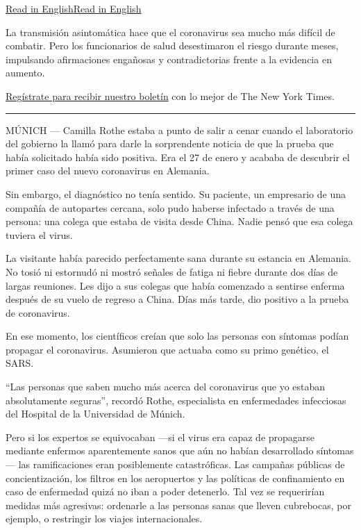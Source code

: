 \href{https://www.nytimes3xbfgragh.onion/2020/06/27/world/europe/coronavirus-spread-asymptomatic.html}{Read
in
English}\href{https://www.nytimes3xbfgragh.onion/2020/06/27/world/europe/coronavirus-spread-asymptomatic.html}{Read
in English}

La transmisión asintomática hace que el coronavirus sea mucho más
difícil de combatir. Pero los funcionarios de salud desestimaron el
riesgo durante meses, impulsando afirmaciones engañosas y
contradictorias frente a la evidencia en aumento.

\href{https://www.nytimes3xbfgragh.onion/newsletters/el-times}{Regístrate
para recibir nuestro boletín} con lo mejor de The New York Times.

\begin{center}\rule{0.5\linewidth}{\linethickness}\end{center}

MÚNICH --- Camilla Rothe estaba a punto de salir a cenar cuando el
laboratorio del gobierno la llamó para darle la sorprendente noticia de
que la prueba que había solicitado había sido positiva. Era el 27 de
enero y acababa de descubrir el primer caso del nuevo coronavirus en
Alemania.

Sin embargo, el diagnóstico no tenía sentido. Su paciente, un empresario
de una compañía de autopartes cercana, solo pudo haberse infectado a
través de una persona: una colega que estaba de visita desde China.
Nadie pensó que esa colega tuviera el virus.

La visitante había parecido perfectamente sana durante su estancia en
Alemania. No tosió ni estornudó ni mostró señales de fatiga ni fiebre
durante dos días de largas reuniones. Les dijo a sus colegas que había
comenzado a sentirse enferma después de su vuelo de regreso a China.
Días más tarde, dio positivo a la prueba de coronavirus.

En ese momento, los científicos creían que solo las personas con
síntomas podían propagar el coronavirus. Asumieron que actuaba como su
primo genético, el SARS.

``Las personas que saben mucho más acerca del coronavirus que yo estaban
absolutamente seguras'', recordó Rothe, especialista en enfermedades
infecciosas del Hospital de la Universidad de Múnich.

Pero si los expertos se equivocaban ---si el virus era capaz de
propagarse mediante enfermos aparentemente sanos que aún no habían
desarrollado síntomas--- las ramificaciones eran posiblemente
catastróficas. Las campañas públicas de concientización, los filtros en
los aeropuertos y las políticas de confinamiento en caso de enfermedad
quizá no iban a poder detenerlo. Tal vez se requerirían medidas más
agresivas: ordenarle a las personas sanas que lleven cubrebocas, por
ejemplo, o restringir los viajes internacionales.

